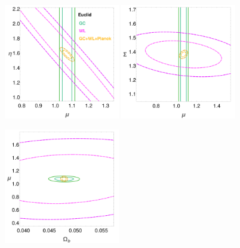 \begin{figure}[htbp]
	\centering
\begin{centering}
\includegraphics[width=0.45\textwidth]{Chapters/linear-nonlinear-MG-forecasts/figures/ellipses/DE-related/ellipsesPlot-withLegendManual-MuEtaFisher-Marged-fiducialMGDE2nonuhs-GC_WL_GC+WL+Planck--nlHS-pars-6-7_-.pdf}
\includegraphics[width=0.45\textwidth]{Chapters/linear-nonlinear-MG-forecasts/figures/ellipses/DE-related/ellipsesPlot-noLegendManual-MuSigmaFisher-Marged-fiducialMGDE2nonuhs-GC_WL_GC+WL+Planck--nlHS-pars-6-7_-.pdf} \\
\end{centering}
\begin{centering}
\includegraphics[width=0.45\textwidth]{Chapters/linear-nonlinear-MG-forecasts/figures/ellipses/DE-related/ellipsesPlot-noLegendManual-MuSigmaFisher-Marged-fiducialMGDE2nonuhs-GC_WL_GC+WL+Planck--nlHS-pars-2-6_-.pdf}

\end{centering}
\end{figure}
